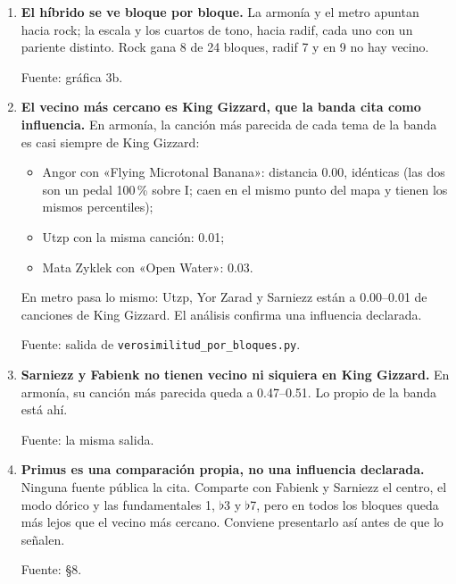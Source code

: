 \documentclass[11pt,a4paper]{article}
\newcommand{\fuente}[1]{\par{\small\color{gris}Fuente: #1}}
\newcommand{\seccion}[1]{\vspace{0.4cm}{\Large\color{azul}\textbf{#1}}\par\vspace{0.1cm}}
\newcommand{\bem}{$\flat$}
\begin{document}
\seccion{5. Síntesis e influencias}
\begin{enumerate}[resume]
\item \textbf{El híbrido se ve bloque por bloque.} La armonía y el metro apuntan hacia rock; la escala y los cuartos
  de tono, hacia radif, cada uno con un pariente distinto. Rock gana 8 de 24 bloques, radif 7 y en 9 no hay vecino.
  \fuente{gráfica 3b.}
\item \textbf{El vecino más cercano es King Gizzard, que la banda cita como influencia.} En armonía, la canción más
  parecida de cada tema de la banda es casi siempre de King Gizzard:
  \begin{itemize}
  \item Angor con «Flying Microtonal Banana»: distancia 0.00, idénticas (las dos son un pedal 100\,\% sobre I; caen en
    el mismo punto del mapa y tienen los mismos percentiles);
  \item Utzp con la misma canción: 0.01;
  \item Mata Zyklek con «Open Water»: 0.03.
  \end{itemize}
  En metro pasa lo mismo: Utzp, Yor Zarad y Sarniezz están a 0.00--0.01 de canciones de King Gizzard. El análisis
  confirma una influencia declarada.
  \fuente{salida de \texttt{verosimilitud\_por\_bloques.py}.}
\item \textbf{Sarniezz y Fabienk no tienen vecino ni siquiera en King Gizzard.} En armonía, su canción más parecida
  queda a 0.47--0.51. Lo propio de la banda está ahí.
  \fuente{la misma salida.}
\item \textbf{Primus es una comparación propia, no una influencia declarada.} Ninguna fuente pública la cita. Comparte
  con Fabienk y Sarniezz el centro, el modo dórico y las fundamentales 1, \bem 3 y \bem 7, pero en todos los bloques
  queda más lejos que el vecino más cercano. Conviene presentarlo así antes de que lo señalen.
  \fuente{§8.}
\end{enumerate}
\end{document}

